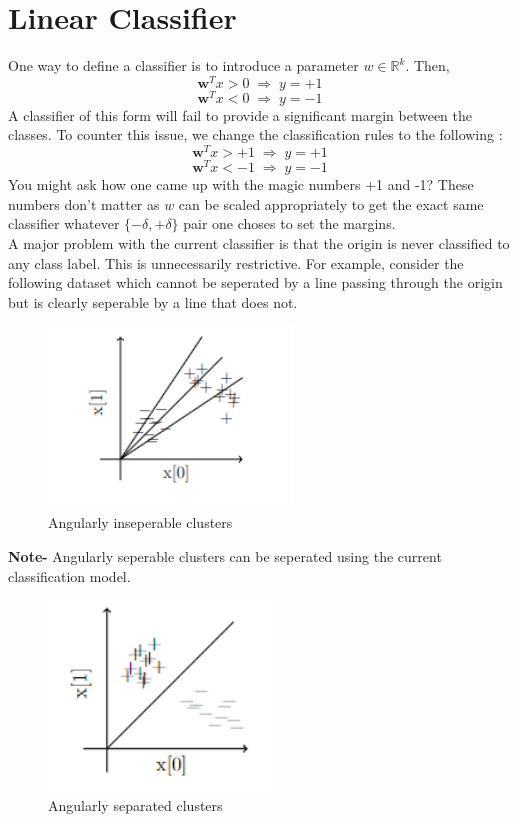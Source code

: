 \documentclass[12pt]{article}
\begin{document}
\section{Linear Classifier}
One way to define a classifier is to introduce a parameter $w \in \mathbb{R}^k$. Then,
$$\mathbf{w}^Tx > 0 \; \Rightarrow \; y=+1$$
$$\mathbf{w}^Tx < 0 \; \Rightarrow \; y=-1$$
A classifier of this form will fail to provide a significant margin between the classes. To counter this issue, we change the classification rules to the following :
$$\mathbf{w}^Tx > +1 \; \Rightarrow \; y=+1$$
$$\mathbf{w}^Tx < -1 \; \Rightarrow \; y=-1$$
You might ask how one came up with the magic numbers +1 and -1? These numbers don't matter as $w$ can be scaled appropriately to get the exact same classifier whatever $\{-\delta, +\delta\}$ pair one choses to set the margins.\\[2mm]
A major problem with the current classifier is that the origin is never classified to any class label. This is unnecessarily restrictive. For example, consider the following dataset which cannot be seperated by a line passing through the origin but is clearly seperable by a line that does not.
 \begin{figure}[H]
    \centering
    \includegraphics[width=6.5cm]{inseperable-no-bias.png}
    \caption{Angularly inseperable clusters}
\end{figure}
\textbf{Note-} Angularly seperable clusters can be seperated using the current classification model.
 \begin{figure}[H]
    \centering
    \includegraphics[width=6cm]{angular-seperable.png}%
    \caption{Angularly separated clusters}
\end{figure}
\end{document}
